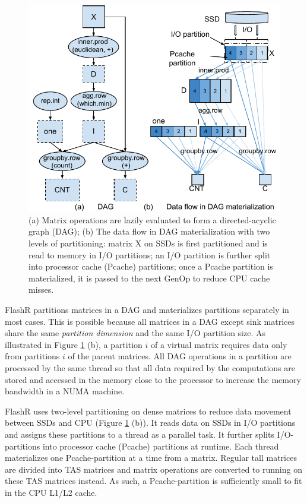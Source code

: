 \begin{figure}
	\centering
	\includegraphics[scale=0.6]{FlashMatrix_figs/kmeans.pdf}
  \vspace{-4pt}
	\caption{(a) Matrix operations are lazily evaluated to form
	a directed-acyclic graph (DAG); (b) The data flow in DAG materialization
	with two levels of partitioning: matrix X on SSDs is first partitioned
	and is read to memory in I/O partitions; an I/O partition is further
	split into processor cache (Pcache) partitions; once a Pcache partition
	is materialized, it is passed to the next GenOp to reduce CPU cache misses. }
	\label{fig:dag}
  \vspace{-8pt}
\end{figure}

FlashR partitions matrices in a DAG and materializes partitions separately in
most cases. This is possible because all matrices in a DAG except sink matrices
share the same \textit{partition dimension} and the same I/O partition size.
As illustrated in Figure \ref{fig:dag} (b), a partition $i$ of a virtual
matrix requires data only from partitions
$i$ of the parent matrices.  All DAG operations in a partition are processed by 
the same thread so that all data required by the computations are stored and
accessed in the memory close to the processor to increase the memory bandwidth
in a NUMA machine.

FlashR uses two-level partitioning on dense matrices to reduce data movement
between SSDs and CPU (Figure \ref{fig:dag} (b)). It reads data on SSDs in
I/O partitions and assigns these partitions to a thread as a parallel task.
It further splits I/O-partitions into processor cache (Pcache) partitions
at runtime.  Each thread materializes one Pcache-partition at a time from
a matrix. Regular tall matrices are divided into TAS matrices and matrix
operations are converted to running on these TAS matrices instead. As such,
a Pcache-partition is sufficiently small to fit in the CPU L1/L2 cache.

